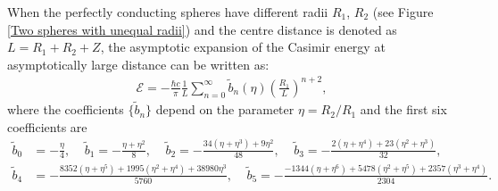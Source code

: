 When the perfectly conducting spheres have different radii $R_{1}$, $R_{2}$ (see Figure \ref{Two spheres with unequal radii}) and the centre distance is denoted as
$L = R_{1} + R_{2} + Z$, the asymptotic expansion of the Casimir energy at asymptotically large distance can be written as:
\begin{align}\label{Asymptotic unequal radii}
    \mathcal{E} = -\frac{\hbar c}{\pi}\frac{1}{L}\sum_{n=0}^{\infty}\tilde{b}_{n}(\eta)\left(\frac{R_{1}}{L}\right)^{n+2},
\end{align}
where the coefficients $\{\tilde{b}_{n}\}$ depend on the parameter $\eta = R_{2}/R_{1}$ and the first six coefficients are
\begin{align*}
    \tilde{b}_{0} &= -\frac{\eta}{4}, \ \ \ \ \ \tilde{b}_{1} = -\frac{\eta + \eta^{2}}{8}, \ \ \ \ \  \tilde{b}_{2} = -\frac{34(\eta+\eta^{3})+ 9\eta^{2}}{48}, \ \ \ \ \ \tilde{b}_{3} = -\frac{2(\eta+\eta^{4}) + 23(\eta^{2} + \eta^{3})}{32}, \\ 
    \tilde{b}_{4} &= -\frac{8352(\eta + \eta^{5})+ 1995(\eta^{2} + \eta^{4}) + 38980\eta^{3}}{5760}, \ \ \ \ \ \tilde{b}_{5} = -\frac{-1344(\eta+\eta^{6}) + 5478(\eta^{2} + \eta^{5})+2357(\eta^{3} + \eta^{4})}{2304}.
\end{align*}

